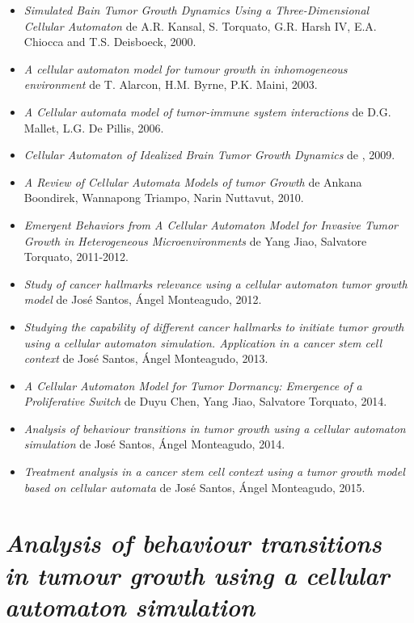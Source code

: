 \begin{itemize}
    \item \textit{Simulated Bain Tumor Growth Dynamics Using a Three-Dimensional Cellular Automaton}
    de A.R. Kansal, S. Torquato, G.R. Harsh IV, E.A. Chiocca and T.S. Deisboeck, 2000.
    \item \textit{A cellular automaton model for tumour growth in inhomogeneous environment}
    de T. Alarcon, H.M. Byrne, P.K. Maini, 2003.
    \item \textit{A Cellular automata model of tumor-immune system interactions}
    de D.G. Mallet, L.G. De Pillis, 2006.
    \item \textit{Cellular Automaton of Idealized Brain Tumor Growth Dynamics}
    de , 2009.
    \item \textit{A Review of Cellular Automata Models of tumor Growth}
    de Ankana Boondirek, Wannapong Triampo, Narin Nuttavut, 2010.
    \item \textit{Emergent Behaviors from A Cellular Automaton Model for Invasive Tumor Growth in Heterogeneous Microenvironments}
    de Yang Jiao, Salvatore Torquato, 2011-2012.
    \item \textit{Study of cancer hallmarks relevance using a cellular automaton tumor growth model}
    de José Santos, Ángel Monteagudo, 2012.
    \item \textit{Studying the capability of different cancer hallmarks to initiate tumor growth using a cellular automaton simulation. Application in a cancer stem cell context}
    de José Santos, Ángel Monteagudo, 2013.
    \item \textit{A Cellular Automaton Model for Tumor Dormancy: Emergence of a Proliferative Switch}
    de Duyu Chen, Yang Jiao, Salvatore Torquato, 2014.
    \item \textit{Analysis of behaviour transitions in tumor growth using a cellular automaton simulation}
    de José Santos, Ángel Monteagudo, 2014.
    \item \textit{Treatment analysis in a cancer stem cell context using a tumor growth model based on cellular automata}
    de José Santos, Ángel Monteagudo, 2015.
\end{itemize}

\section{\textit{Analysis of behaviour transitions in tumour growth
using a cellular automaton simulation}}

